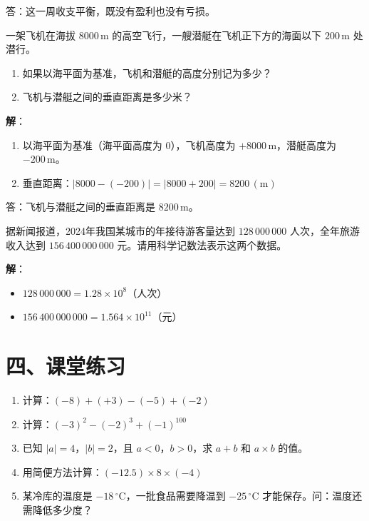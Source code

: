 \documentclass[12pt, a4paper]{ctexart}
\begin{document}
答：这一周收支平衡，既没有盈利也没有亏损。

\begin{appbox}[【应用3】海拔与深度问题]
一架飞机在海拔 $8000\,\mathrm{m}$ 的高空飞行，一艘潜艇在飞机正下方的海面以下 $200\,\mathrm{m}$ 处潜行。
\begin{enumerate}[leftmargin=*]
  \item 如果以海平面为基准，飞机和潜艇的高度分别记为多少？
  \item 飞机与潜艇之间的垂直距离是多少米？
\end{enumerate}
\end{appbox}

\textbf{解}：
\begin{enumerate}[leftmargin=*]
  \item 以海平面为基准（海平面高度为 $0$），飞机高度为 $+8000\,\mathrm{m}$，潜艇高度为 $-200\,\mathrm{m}$。
  \item 垂直距离：$|8000 - (-200)| = |8000 + 200| = 8200\,(\mathrm{m})$
\end{enumerate}

答：飞机与潜艇之间的垂直距离是 $8200\,\mathrm{m}$。

\begin{appbox}[【应用4】科学记数法的实际应用]
据新闻报道，2024年我国某城市的年接待游客量达到 $128\,000\,000$ 人次，全年旅游收入达到 $156\,400\,000\,000$ 元。请用科学记数法表示这两个数据。
\end{appbox}

\textbf{解}：
\begin{itemize}[leftmargin=*]
  \item $128\,000\,000 = 1.28 \times 10^8$（人次）
  \item $156\,400\,000\,000 = 1.564 \times 10^{11}$（元）
\end{itemize}


\section*{\textcolor{tipgreen}{四、课堂练习}}

\begin{enumerate}[leftmargin=*]
  \item 计算：$(-8) + (+3) - (-5) + (-2)$

  \item 计算：$(-3)^2 - (-2)^3 + (-1)^{100}$

  \item 已知 $|a| = 4$，$|b| = 2$，且 $a < 0$，$b > 0$，求 $a + b$ 和 $a \times b$ 的值。

  \item 用简便方法计算：$(-12.5) \times 8 \times (-4)$

  \item 某冷库的温度是 $-18\,^\circ\mathrm{C}$，一批食品需要降温到 $-25\,^\circ\mathrm{C}$ 才能保存。问：温度还需降低多少度？
\end{enumerate}
\end{document}

